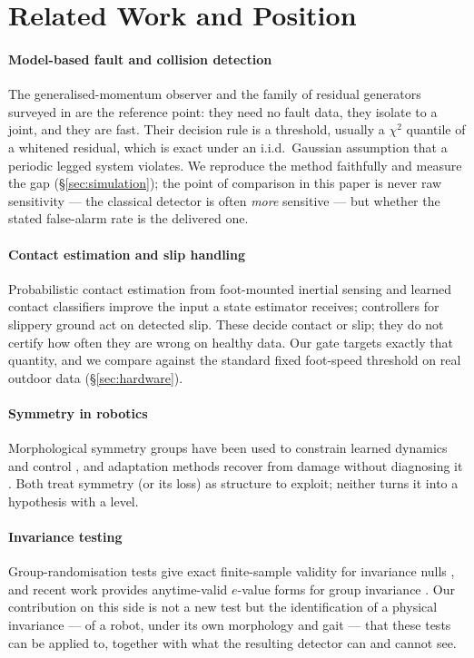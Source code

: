 \section{Related Work and Position}
\label{sec:related}

\paragraph{Model-based fault and collision detection}
The generalised-momentum observer \cite{deluca2003actuator} and the family of residual generators surveyed in
\cite{haddadin2017robot} are the reference point: they need no fault data, they isolate to a joint, and they are fast.
Their decision rule is a threshold, usually a $\chi^2$ quantile of a whitened residual, which is exact under an i.i.d.\
Gaussian assumption that a periodic legged system violates. We reproduce the method faithfully and measure the gap
(\S\ref{sec:simulation}); the point of comparison in this paper is never raw sensitivity --- the classical detector is
often \emph{more} sensitive --- but whether the stated false-alarm rate is the delivered one.

\paragraph{Contact estimation and slip handling}
Probabilistic contact estimation from foot-mounted inertial sensing \cite{camurri2017probabilistic} and learned contact
classifiers \cite{lin2021contact} improve the input a state estimator receives; controllers for slippery ground
\cite{jenelten2019slippery} act on detected slip. These decide contact or slip; they do not certify how often they are
wrong on healthy data. Our gate targets exactly that quantity, and we compare against the standard fixed foot-speed
threshold on real outdoor data (\S\ref{sec:hardware}).

\paragraph{Symmetry in robotics}
Morphological symmetry groups have been used to constrain learned dynamics and control
\cite{ordonez2023discrete}, and adaptation methods recover from damage without diagnosing it \cite{cully2015adapt}.
Both treat symmetry (or its loss) as structure to exploit; neither turns it into a hypothesis with a level.

\paragraph{Invariance testing}
Group-randomisation tests give exact finite-sample validity for invariance nulls \cite{hemerik2018exact}, and recent
work provides anytime-valid $e$-value forms for group invariance \cite{koning2023evalues,vovk2021evalues}. Our
contribution on this side is not a new test but the identification of a physical invariance --- of a robot, under its
own morphology and gait --- that these tests can be applied to, together with what the resulting detector can and cannot
see.

